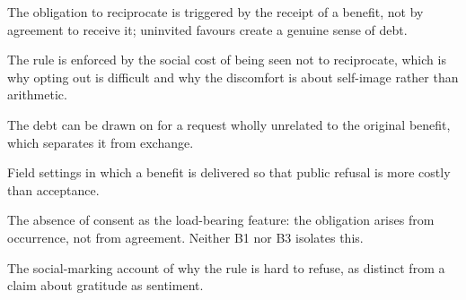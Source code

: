 

\begin{distilled}
  \item The obligation to reciprocate is triggered by the receipt of a benefit, not by agreement to receive it; uninvited favours create a genuine sense of debt.
  \item The rule is enforced by the social cost of being seen not to reciprocate, which is why opting out is difficult and why the discomfort is about self-image rather than arithmetic.
  \item The debt can be drawn on for a request wholly unrelated to the original benefit, which separates it from exchange.
  \item Field settings in which a benefit is delivered so that public refusal is more costly than acceptance.
\end{distilled}

\begin{unique}
  \item The absence of consent as the load-bearing feature: the obligation arises from occurrence, not from agreement. Neither B1 nor B3 isolates this.
  \item The social-marking account of why the rule is hard to refuse, as distinct from a claim about gratitude as sentiment.
\end{unique}

